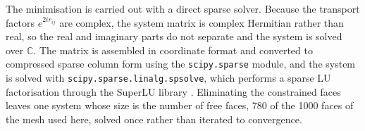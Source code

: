 The minimisation is carried out with a direct sparse solver. Because the transport factors \(e^{2ir_{ij}}\) are complex, the system matrix is complex Hermitian rather than real, so the real and imaginary parts do not separate and the system is solved over \(\mathbb{C}\). The matrix is assembled in coordinate format and converted to compressed sparse column form using the \texttt{scipy.sparse} module, and the system is solved with \texttt{scipy.sparse.linalg.spsolve}, which performs a sparse LU factorisation through the SuperLU library \cite{scipy2020}. Eliminating the constrained faces leaves one system whose size is the number of free faces, 780 of the 1000 faces of the mesh used here, solved once rather than iterated to convergence.
